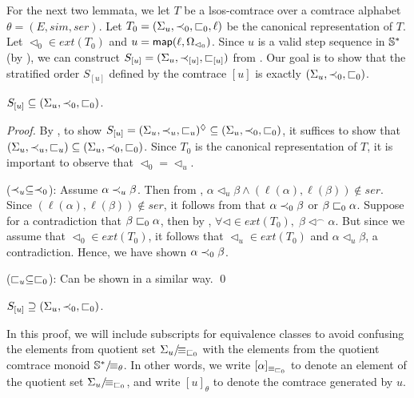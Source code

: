 \documentclass{llncs}
\begin{document}
For the next two lemmata, we let $T$ be a lsos-comtrace over a comtrace alphabet $\theta=(E,sim,ser)$. Let $T_{0}=(\Sigma_{u},\prec_{0},\sqsubset_{0},\ell)$ be the canonical representation of $T$. Let $\lhd_{0}\in ext(T_0)$ and $u=\mathsf{map}(\ell,\Omega_{\lhd_{0}})$. Since $u$ is a valid step sequence in $\mathbb{S}^*$ (by ), we can construct $S_{[u]} = (\Sigma_{u},\prec_{[u]},\sqsubset_{[u]})$ from . Our goal is to show that the stratified order $S_{[u]}$ defined by the comtrace $[u]$ is exactly $(\Sigma_{u},\prec_{0},\sqsubset_{0})$.

\begin{lemma} $S_{[u]} \subseteq (\Sigma_{u},\prec_{0},\sqsubset_{0})$.
\label{lem:l1}
\end{lemma}
\begin{proof} By , to show $S_{[u]} = (\Sigma_{u},\prec_{u},\sqsubset_{u})^{\lozenge} \subseteq (\Sigma_{u},\prec_{0},\sqsubset_{0})$, it suffices to show that $(\Sigma_{u},\prec_{u},\sqsubset_{u}) \subseteq (\Sigma_{u},\prec_{0},\sqsubset_{0})$. Since $T_0$ is the canonical representation of $T$, it is important to observe that $\lhd_0=\lhd_u$.

($\prec_{u}\subseteq \prec_{0}$): Assume $\alpha\prec_{u}\beta$. Then from , $\alpha\lhd_u\beta \wedge (\ell(\alpha),\ell(\beta))\notin ser$. Since $(\ell(\alpha),\ell(\beta))\notin ser$, it follows from  that  $\alpha \prec_{0} \beta$ or $\beta\sqsubset_{0} \alpha$.  Suppose for a contradiction that $\beta\sqsubset_{0} \alpha$, then by ,  $\forall \lhd \in ext(T_{0}),\; \beta \lhd^{\frown}\alpha$. But since we assume that $\lhd_{0}\in ext(T_0)$, it follows that $\lhd_{u}\in ext(T_{0})$ and $\alpha \lhd_{u} \beta$, a contradiction. Hence, we have shown $\alpha \prec_{0} \beta$.

($\sqsubset_{u}\subseteq \sqsubset_{0}$):  Can be shown in a similar way.
\qed
\end{proof}





\begin{lemma} $S_{[u]} \supseteq (\Sigma_{u},\prec_{0},\sqsubset_{0})$.
\label{lem:l2}
\end{lemma}

In this proof, we will include subscripts for equivalence classes to avoid confusing the elements from quotient set ${\Sigma_{u}}/\!{\equiv_{\sqsubset_{0}}}$ with the elements from the quotient comtrace monoid ${\mathbb{S}^*}/\!{\equiv_{\theta}}$. In other words, we write $[\alpha]_{\equiv_{\sqsubset_{0}}}$ to denote an element of the quotient set ${\Sigma_{u}}/\!{\equiv_{\sqsubset_{0}}}$, and write $[u]_{\theta}$ to denote the comtrace generated by $u$. 
\end{document}
